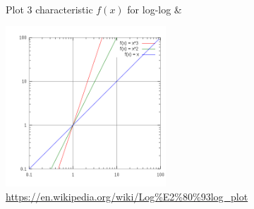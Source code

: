{\\ \hline

Plot 3 characteristic $f(x)$ for log-log &\begin{minipage}{.375\textwidth}
      \includegraphics[width=\linewidth, height=60mm]{images/LogLog.png}
      \tiny \url{https://en.wikipedia.org/wiki/Log\%E2\%80\%93log_plot}
    \end{minipage} 
 
  \\ \hline
}


